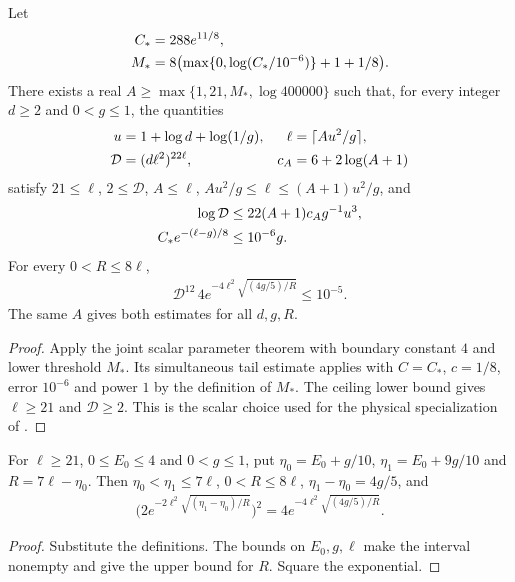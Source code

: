\begin{lemma}
    \label{thm:physical_dg_scalar_parameters}
    \leanok
    Let
    \begin{align}
        C_* & =288e^{11/8},\notag                              \\
        M_* & =8\bigl(\max\{0,\log(C_*/10^{-6})\}+1+1/8\bigr).
    \end{align}
    There exists a real $A\ge\max\{1,21,M_*,\log400000\}$ such that,
    for every integer $d\ge2$ and $0<g\le1$, the quantities
    \begin{align}
        u          & =1+\log d+\log(1/g), & \ell & =\lceil Au^2/g\rceil,\notag \\
        \mathcal D & =(d\ell^2)^{22\ell}, & c_A  & =6+2\log(A+1)
    \end{align}
    satisfy $21\le\ell$, $2\le\mathcal D$, $A\le\ell$,
    $Au^2/g\le\ell\le(A+1)u^2/g$, and
    \begin{align}
        \log\mathcal D     & \le22(A+1)c_Ag^{-1}u^3,\notag \\
        C_*e^{-(\ell-g)/8} & \le10^{-6}g.
    \end{align}
    For every $0<R\le8\ell$,
    \begin{align}
        \mathcal D^{12}\,4e^{-4\ell^2\sqrt{(4g/5)/R}}\le10^{-5}.
    \end{align}
    The same $A$ gives both estimates for all $d,g,R$.
\end{lemma}
\begin{proof}
    \leanok
    Apply the joint scalar parameter theorem with boundary constant $4$
    and lower threshold $M_*$. Its simultaneous tail estimate applies with
    $C=C_*$, $c=1/8$, error $10^{-6}$ and power $1$ by the definition of
    $M_*$. The ceiling lower bound gives $\ell\ge21$ and $\mathcal D\ge2$.
    This is the scalar choice used for the physical specialization of
    \cite[Theorem t:ais, lines 1010--1024]{Arad2016RigorousRG}.
\end{proof}

\begin{lemma}
    \label{thm:physical_chebyshev_endpoints}
    \leanok
    For $\ell\ge21$, $0\le E_0\le4$ and $0<g\le1$, put
    $\eta_0=E_0+g/10$, $\eta_1=E_0+9g/10$ and $R=7\ell-\eta_0$.
    Then $\eta_0<\eta_1\le7\ell$, $0<R\le8\ell$,
    $\eta_1-\eta_0=4g/5$, and
    \begin{align}
        \bigl(2e^{-2\ell^2\sqrt{(\eta_1-\eta_0)/R}}\bigr)^2
        =4e^{-4\ell^2\sqrt{(4g/5)/R}}.
    \end{align}
\end{lemma}
\begin{proof}
    \leanok
    Substitute the definitions. The bounds on $E_0,g,\ell$ make the interval
    nonempty and give the upper bound for $R$. Square the exponential.
\end{proof}

